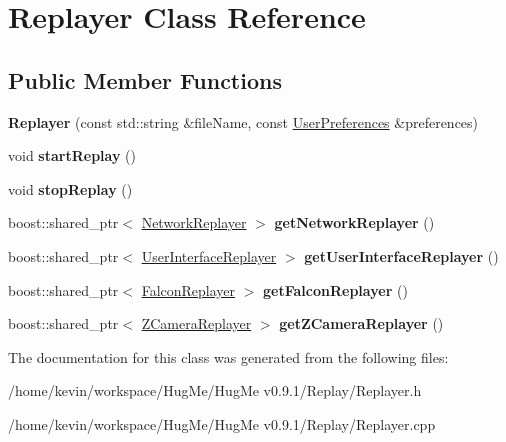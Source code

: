 \hypertarget{classReplayer}{
\section{Replayer Class Reference}
\label{classReplayer}
}
\subsection*{Public Member Functions}
\begin{DoxyCompactItemize}
\item 
\hypertarget{classReplayer_a233ae971345bbadd96ecb5d868800ed8}{
{\bfseries Replayer} (const std::string \&fileName, const \hyperlink{structUserPreferences}{UserPreferences} \&preferences)}
\label{classReplayer_a233ae971345bbadd96ecb5d868800ed8}

\item 
\hypertarget{classReplayer_aaeeb2f5ae160cf99f8e07401c906d07f}{
void {\bfseries startReplay} ()}
\label{classReplayer_aaeeb2f5ae160cf99f8e07401c906d07f}

\item 
\hypertarget{classReplayer_abf2424525cedca13f7321f59036a403c}{
void {\bfseries stopReplay} ()}
\label{classReplayer_abf2424525cedca13f7321f59036a403c}

\item 
\hypertarget{classReplayer_a6d15b7b0bc222b486ddf2b86cb12e1cb}{
boost::shared\_\-ptr$<$ \hyperlink{classNetworkReplayer}{NetworkReplayer} $>$ {\bfseries getNetworkReplayer} ()}
\label{classReplayer_a6d15b7b0bc222b486ddf2b86cb12e1cb}

\item 
\hypertarget{classReplayer_a272dafad83fa64f509fbe1db67ed0e0c}{
boost::shared\_\-ptr$<$ \hyperlink{classUserInterfaceReplayer}{UserInterfaceReplayer} $>$ {\bfseries getUserInterfaceReplayer} ()}
\label{classReplayer_a272dafad83fa64f509fbe1db67ed0e0c}

\item 
\hypertarget{classReplayer_a472e6ebecd1f0ea89d6bd19d1ab79102}{
boost::shared\_\-ptr$<$ \hyperlink{classFalconReplayer}{FalconReplayer} $>$ {\bfseries getFalconReplayer} ()}
\label{classReplayer_a472e6ebecd1f0ea89d6bd19d1ab79102}

\item 
\hypertarget{classReplayer_a56299bc514f243c88da07fe0260e5eab}{
boost::shared\_\-ptr$<$ \hyperlink{classZCameraReplayer}{ZCameraReplayer} $>$ {\bfseries getZCameraReplayer} ()}
\label{classReplayer_a56299bc514f243c88da07fe0260e5eab}

\end{DoxyCompactItemize}


The documentation for this class was generated from the following files:\begin{DoxyCompactItemize}
\item 
/home/kevin/workspace/HugMe/HugMe v0.9.1/Replay/Replayer.h\item 
/home/kevin/workspace/HugMe/HugMe v0.9.1/Replay/Replayer.cpp\end{DoxyCompactItemize}
